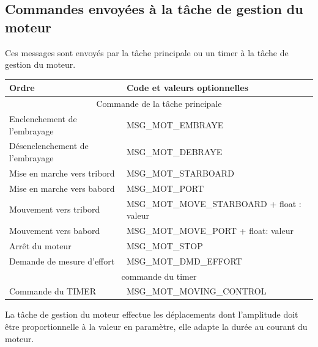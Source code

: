 \documentclass[a4paper,11pt]{report}
\begin{document}
\subsection{Commandes envoyées à la tâche de gestion du moteur}
Ces messages sont envoyés par la tâche principale ou un timer
à la tâche de gestion du moteur.
\\
\begin{tabular}{|l|l|}
	\hline 
	Ordre & Code et valeurs optionnelles \\ 
	\hline
	\multicolumn{2}{|c|}{Commande de la tâche principale} \\
	\hline 
    Enclenchement de l'embrayage & MSG\_MOT\_EMBRAYE\\
    Désenclenchement de l'embrayage & MSG\_MOT\_DEBRAYE\\
    Mise en marche vers tribord & MSG\_MOT\_STARBOARD\\
    Mise en marche vers babord  & MSG\_MOT\_PORT\\
    Mouvement vers tribord & MSG\_MOT\_MOVE\_STARBOARD + float : valeur\\
    Mouvement vers babord  & MSG\_MOT\_MOVE\_PORT + float: valeur\\
    Arrêt du moteur & MSG\_MOT\_STOP\\
    Demande de mesure d'effort & MSG\_MOT\_DMD\_EFFORT\\
    \hline
	\multicolumn{2}{|c|}{commande du timer} \\
	\hline
	Commande du TIMER & MSG\_MOT\_MOVING\_CONTROL\\
    \hline
\end{tabular} 

La tâche de gestion du moteur effectue les déplacements
dont l'amplitude doit être proportionnelle à la valeur en paramètre,
elle adapte la durée au courant du moteur.



\printbibliography
\end{document}
